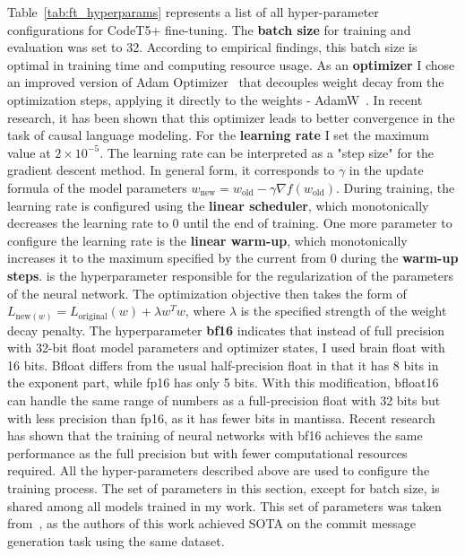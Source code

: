 Table~\ref{tab:ft_hyperparams} represents a list of all hyper-parameter configurations for CodeT5+ fine-tuning. The \textbf{batch size} for training and evaluation was set to 32. According to empirical findings, this batch size is optimal in training time and computing resource usage. As an \textbf{optimizer} I chose an improved version of Adam Optimizer~\cite{kingma2014adam} that decouples weight decay from the optimization steps, applying it directly to the weights - AdamW~\cite{loshchilov2017decoupled}. In recent research, it has been shown that this optimizer leads to better convergence in the task of causal language modeling. For the \textbf{learning rate} I set the maximum value at $2 \times 10^{-5}$. The learning rate can be interpreted as a "step size" for the gradient descent method. In general form, it corresponds to $\gamma$ in the update formula of the model parameters $w_{\text{new}} = w_{\text{old}} - \gamma \nabla f(w_{\text{old}})$. During training, the learning rate is configured using the \textbf{linear scheduler}, which monotonically decreases the learning rate to 0 until the end of training. One more parameter to configure the learning rate is the \textbf{linear warm-up}, which monotonically increases it to the maximum specified by the current from 0 during the \textbf{warm-up steps}.  is the hyperparameter responsible for the regularization of the parameters of the neural network. The optimization objective then takes the form of $L_{\text{new}(w)} = L_{\text{original}}(w) + \lambda w^Tw$, where $\lambda$ is the specified strength of the weight decay penalty. The hyperparameter \textbf{ bf16} indicates that instead of full precision with 32-bit float model parameters and optimizer states, I used brain float with 16 bits. Bfloat differs from the usual half-precision float in that it has 8 bits in the exponent part, while fp16 has only 5 bits. With this modification, bfloat16 can handle the same range of numbers as a full-precision float with 32 bits but with less precision than fp16, as it has fewer bits in mantissa. Recent research~\cite{kalamkar2019study} has shown that the training of neural networks with bf16 achieves the same performance as the full precision but with fewer computational resources required. 
All the hyper-parameters described above are used to configure the training process. The set of parameters in this section, except for batch size, is shared among all models trained in my work. This set of parameters was taken from~\cite{eliseeva2023commit}, as the authors of this work achieved SOTA on the commit message generation task using the same dataset.

